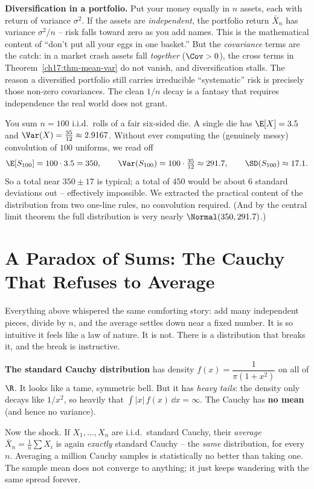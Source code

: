 \begin{applicationbox}
\textbf{Diversification in a portfolio.} Put your money equally in $n$
assets, each with return of variance $\sigma^2$. If the assets are
\emph{independent}, the portfolio return $\bar X_n$ has variance
$\sigma^2/n$ -- risk falls toward zero as you add names. This is the
mathematical content of ``don't put all your eggs in one basket.'' But the
\emph{covariance} terms are the catch: in a market crash assets fall
\emph{together} ($\Cov>0$), the cross terms in
Theorem~\ref{ch17:thm-mean-var} do not vanish, and diversification stalls.
The reason a diversified portfolio still carries irreducible
``systematic'' risk is precisely those non-zero covariances. The clean
$1/n$ decay is a fantasy that requires independence the real world does
not grant.
\end{applicationbox}

\begin{example}
\label{ch17:ex-meanvar}
You sum $n=100$ i.i.d.\ rolls of a fair six-sided die. A single die has
$\E[X]=3.5$ and $\Var(X)=\frac{35}{12}\approx 2.9167$. Without ever
computing the (genuinely messy) convolution of $100$ uniforms, we read off
\[
\E[S_{100}] = 100\cdot 3.5 = 350,\qquad
\Var(S_{100}) = 100\cdot\tfrac{35}{12} \approx 291.7,\qquad
\SD(S_{100}) \approx 17.1.
\]
So a total near $350\pm 17$ is typical; a total of $450$ would be about
$6$ standard deviations out -- effectively impossible. We extracted the
practical content of the distribution from two one-line rules, no
convolution required. (And by the central limit theorem the full
distribution is very nearly $\Normal(350,291.7)$.)
\end{example}

\section{A Paradox of Sums: The Cauchy That Refuses to Average}
\label{ch17:cauchy}

Everything above whispered the same comforting story: add many independent
pieces, divide by $n$, and the average settles down near a fixed number.
It is so intuitive it feels like a law of nature. It is not. There is a
distribution that breaks it, and the break is instructive.

\begin{paradoxbox}
\textbf{The standard Cauchy distribution} has density
$f(x)=\dfrac{1}{\pi(1+x^2)}$ on all of $\R$. It looks like a tame,
symmetric bell. But it has \emph{heavy tails}: the density only decays like
$1/x^2$, so heavily that $\int |x|\,f(x)\,\dd x=\infty$. The Cauchy has
\textbf{no mean} (and hence no variance).

Now the shock. If $X_1,\dots,X_n$ are i.i.d.\ standard Cauchy, their
\emph{average} $\bar X_n=\frac{1}{n}\sum X_i$ is again \emph{exactly}
standard Cauchy -- the \emph{same} distribution, for every $n$. Averaging
a million Cauchy samples is statistically no better than taking one. The
sample mean does not converge to anything; it just keeps wandering with
the same spread forever.
\end{paradoxbox}

